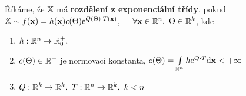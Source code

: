 \begin{define}
	Říkáme, že $\mathbb{X}$ má \textbf{rozdělení z exponenciální třídy}, pokud \newline $\mathbb{X}\sim f(\textbf{x})=h(\textbf{x})c(\Theta)\mathrm{e}^{Q(\Theta)\cdot T(\textbf{x})}$,~~~$\forall \textbf{x}\in\mathbb{R}^n,~ \Theta\in\mathbb{R}^k$, kde \begin{enumerate}
		\item $h:\mathbb{R}^n\to\mathbb{R}_0^+,$
		\item $c(\Theta)\in\mathbb{R}^+$ je normovací konstanta, $c(\Theta)=\int\limits_{\mathbb{R}^n}h\mathrm{e}^{Q\cdot T}\mathrm{d}\textbf{x}<+\infty$
		\item $Q:\mathbb{R}^k\to\mathbb{R}^k,~T:\mathbb{R}^n\to\mathbb{R}^k,~k<n$
	\end{enumerate}
\end{define}
